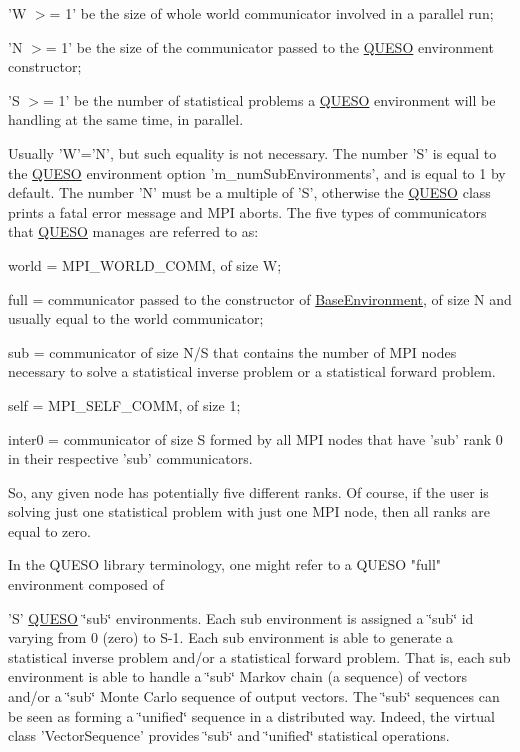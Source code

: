 \begin{DoxyEnumerate}
\begin{DoxyEnumerate}
\item 'W $>$= 1' be the size of whole world communicator involved in a parallel run; 
\item 'N $>$= 1' be the size of the communicator passed to the \hyperlink{namespace_q_u_e_s_o}{Q\-U\-E\-S\-O} environment constructor; 
\item 'S $>$= 1' be the number of statistical problems a \hyperlink{namespace_q_u_e_s_o}{Q\-U\-E\-S\-O} environment will be handling at the same time, in parallel. 
\end{DoxyEnumerate}Usually 'W'='N', but such equality is not necessary. The number 'S' is equal to the \hyperlink{namespace_q_u_e_s_o}{Q\-U\-E\-S\-O} environment option 'm\-\_\-num\-Sub\-Environments', and is equal to 1 by default. The number 'N' must be a multiple of 'S', otherwise the \hyperlink{namespace_q_u_e_s_o}{Q\-U\-E\-S\-O} class prints a fatal error message and M\-P\-I aborts. The five types of communicators that \hyperlink{namespace_q_u_e_s_o}{Q\-U\-E\-S\-O} manages are referred to as\-: 
\begin{DoxyEnumerate}
\item world = M\-P\-I\-\_\-\-W\-O\-R\-L\-D\-\_\-\-C\-O\-M\-M, of size W; 
\item full = communicator passed to the constructor of \hyperlink{class_q_u_e_s_o_1_1_base_environment}{Base\-Environment}, of size N and usually equal to the world communicator; 
\item sub = communicator of size N/\-S that contains the number of M\-P\-I nodes necessary to solve a statistical inverse problem or a statistical forward problem. 
\item self = M\-P\-I\-\_\-\-S\-E\-L\-F\-\_\-\-C\-O\-M\-M, of size 1; 
\item inter0 = communicator of size S formed by all M\-P\-I nodes that have 'sub' rank 0 in their respective 'sub' communicators. 
\end{DoxyEnumerate}So, any given node has potentially five different ranks. Of course, if the user is solving just one statistical problem with just one M\-P\-I node, then all ranks are equal to zero. 



\begin{DoxyVerb}In the QUESO library terminology, one might refer to a QUESO "full" environment composed of
\end{DoxyVerb}
 'S' \hyperlink{namespace_q_u_e_s_o}{Q\-U\-E\-S\-O} \char`\"{}sub\char`\"{} environments. Each sub environment is assigned a \char`\"{}sub\char`\"{} id varying from 0 (zero) to S-\/1. Each sub environment is able to generate a statistical inverse problem and/or a statistical forward problem. That is, each sub environment is able to handle a \char`\"{}sub\char`\"{} Markov chain (a sequence) of vectors and/or a \char`\"{}sub\char`\"{} Monte Carlo sequence of output vectors. The \char`\"{}sub\char`\"{} sequences can be seen as forming a \char`\"{}unified\char`\"{} sequence in a distributed way. Indeed, the virtual class 'Vector\-Sequence' provides \char`\"{}sub\char`\"{} and \char`\"{}unified\char`\"{} statistical operations.


\end{DoxyEnumerate}

